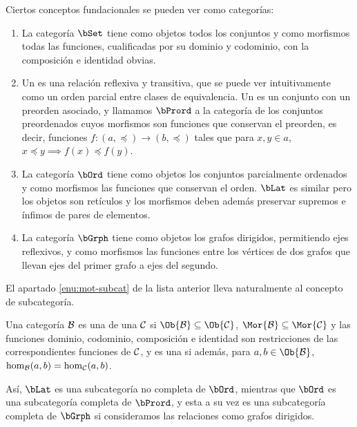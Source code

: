 \begin{example}
  Ciertos conceptos fundacionales se pueden ver como categorías:
  \begin{enumerate}
  \item La categoría $\bSet$ tiene como objetos todos los conjuntos y como
    morfismos todas las funciones, cualificadas por su dominio y codominio, con
    la composición e identidad obvias.
  \item Un  es una relación reflexiva y transitiva, que se puede
    ver intuitivamente como un orden parcial entre clases de equivalencia. Un
     es un conjunto con un preorden asociado, y
    llamamos $\bPrord$ a la categoría de los conjuntos preordenados cuyos
    morfismos son funciones que conservan el preorden, es decir, funciones
    $f:(a,\preceq)\to(b,\preccurlyeq)$ tales que para $x,y\in a$,
    $x\preceq y\implies f(x)\preccurlyeq f(y)$.
  \item \label{enu:mot-subcat} La categoría $\bOrd$ tiene como objetos los
    conjuntos parcialmente ordenados y como morfismos las funciones que
    conservan el orden. $\bLat$ es similar pero los objetos son retículos y los
    morfismos deben además preservar supremos e ínfimos de pares de elementos.
  \item La categoría $\bGrph$ tiene como objetos los grafos dirigidos,
    permitiendo ejes reflexivos, y como morfismos las funciones entre los
    vértices de dos grafos que llevan ejes del primer grafo a ejes del
    segundo.
  \end{enumerate}
\end{example}

El apartado \ref{enu:mot-subcat} de la lista anterior lleva naturalmente al
concepto de subcategoría.

\begin{definition}
  Una categoría $\mathcal{B}$ es una  de una $\mathcal{C}$ si
  $\Ob{\cB}\subseteq\Ob{\cC}$, $\Mor{\cB}\subseteq\Mor{\cC}$ y las funciones
  dominio, codominio, composición e identidad son restricciones de las
  correspondientes funciones de $\mathcal{C}$, y es una  si
  además, para $a,b\in\Ob{\cB}$, $\hom_{\mathcal{B}}(a,b)=\hom_{\mathcal{C}}(a,b)$.
\end{definition}

Así, $\bLat$ es una subcategoría no completa de $\bOrd$, mientras que $\bOrd$ es
una subcategoría completa de $\bPrord$, y esta a su vez es una subcategoría
completa de $\bGrph$ si consideramos las relaciones como grafos dirigidos.

